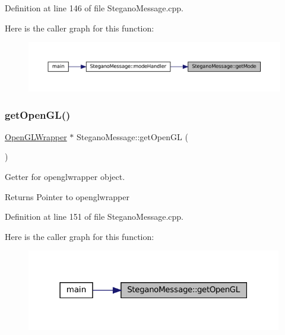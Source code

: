 Definition at line 146 of file Stegano\+Message.\+cpp.

Here is the caller graph for this function\+:\nopagebreak
\begin{figure}[H]
\begin{center}
\leavevmode
\includegraphics[width=350pt]{classSteganoMessage_a7dc660e6d2c8f162636f789cfedde67e_icgraph}
\end{center}
\end{figure}
\mbox{\label{classSteganoMessage_a23e0b48ee048e07488f06818bfd5a466}} 
\subsubsection{\texorpdfstring{getOpenGL()}{getOpenGL()}}
{\footnotesize\ttfamily \mbox{\hyperlink{classOpenGLWrapper}{Open\+G\+L\+Wrapper}} $\ast$ Stegano\+Message\+::get\+Open\+GL (\begin{DoxyParamCaption}{ }\end{DoxyParamCaption})}



Getter for openglwrapper object. 

\begin{DoxyReturn}{Returns}
Pointer to openglwrapper 
\end{DoxyReturn}


Definition at line 151 of file Stegano\+Message.\+cpp.

Here is the caller graph for this function\+:\nopagebreak
\begin{figure}[H]
\begin{center}
\leavevmode
\includegraphics[width=316pt]{classSteganoMessage_a23e0b48ee048e07488f06818bfd5a466_icgraph}
\end{center}
\end{figure}
\mbox{\label{classSteganoMessage_ace172144e49a4da69b890958b3b8089b}} 
